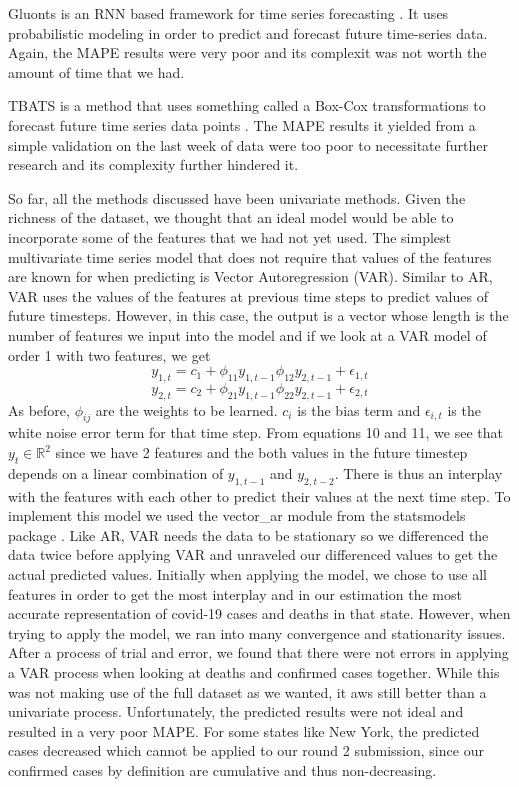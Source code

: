 \documentclass[sigconf,nonacm]{acmart}
\begin{document}
Gluonts is an RNN based framework for time series forecasting \cite{Gluonts}. It uses
probabilistic modeling in order to predict and forecast future time-series
data. Again, the MAPE results were very poor and its complexit was not worth
the amount of time that we had.

TBATS is a method that uses something called a Box-Cox transformations to
forecast future time series data points \cite{TBATS}. The MAPE results it
yielded from a simple validation on the last week of data were too  poor to
necessitate further research and its complexity further hindered it.

So far, all the methods discussed have been univariate methods. Given the richness
of the dataset, we thought that an ideal model would be able to incorporate some of 
the features that we had not yet used. The simplest multivariate time series model 
that does not require that values of the features are known for when predicting is 
Vector Autoregression (VAR). Similar to AR, VAR uses the values of the features at
previous time steps to predict values of future timesteps. However, in this case,
the output is a vector whose length is the number of features we input into the model
and if we look at a VAR model of order 1 with two features, we get \cite{forecasting}
\begin{equation}
  y_{1,t} = c_1 + \phi_{11}y_{1,t-1} \phi_{12}y_{2,t-1} + \epsilon_{1,t}
\end{equation}
\begin{equation}
  y_{2,t} = c_2 + \phi_{21}y_{1,t-1} \phi_{22}y_{2,t-1} + \epsilon_{2,t}
\end{equation}
As before, $\phi_{ij}$ are the weights to be learned. $c_i$ is the bias term and $\epsilon_{i,t}$ is 
the white noise error term for that time step. 
From equations 10 and 11, we see that $y_t \in \mathbb{R}^2$ since we have 2 features and
the both values in the future timestep depends on a linear combination of  $y_{1,t-1}$ and $y_{2,t-2}$. There is
thus an interplay with the features with each other to predict their values at the next 
time step. To implement this model we used the vector\_ar module from the statsmodels 
package \cite{statsmodels}. Like AR, VAR needs the data to be stationary so we differenced
the data twice before applying VAR and unraveled our differenced values to get the actual
predicted values. Initially when applying the model, we chose to use all features in order
to get the most interplay and in our estimation the most accurate representation of 
covid-19 cases and deaths in that state. However, when trying to apply the model, we ran into many 
convergence and stationarity issues. After a process of trial and error, we found that 
there were not errors in applying a VAR process when looking at deaths and confirmed cases together.
While this was not making use of the full dataset as we wanted, it aws still better than a univariate
process. Unfortunately, the predicted results were not ideal and resulted in a very poor MAPE. For some
states like New York, the predicted cases decreased which cannot be applied to our round 2 submission, since
our confirmed cases by definition are cumulative and thus non-decreasing.
\end{document}
